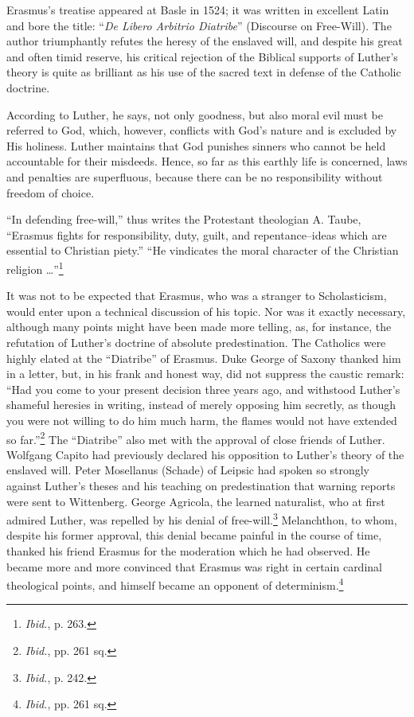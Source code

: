 Erasmus’s treatise appeared at Basle in 1524; it was written in
excellent Latin and bore the title: “\textit{De Libero Arbitrio Diatribe}”
(Discourse on Free-Will). The author triumphantly refutes the
heresy of the enslaved will, and despite his great and often timid
reserve, his critical rejection of the Biblical supports of Luther’s
theory is quite as brilliant as his use of the sacred text in defense
of the Catholic doctrine.

According to Luther, he says, not only goodness, but also moral evil must
be referred to God, which, however, conflicts with God’s nature and is excluded
by His holiness. Luther maintains that God punishes sinners who
cannot be held accountable for their misdeeds. Hence, so far as this earthly
life is concerned, laws and penalties are superfluous, because there can be
no responsibility without freedom of choice.

“In defending free-will,” thus writes the Protestant theologian A. Taube,
“Erasmus fights for responsibility, duty, guilt, and repentance--ideas which
are essential to Christian piety.” “He vindicates the moral character of the
Christian religion \dots''\footnote{\textit{Ibid.}, p. 263.}

It was not to be expected that Erasmus, who was a stranger to
Scholasticism, would enter upon a technical discussion of his topic.
Nor was it exactly necessary, although many points might have been
made more telling, as, for instance, the refutation of Luther’s doctrine
of absolute predestination. The Catholics were highly elated at the
“Diatribe” of Erasmus. Duke George of Saxony thanked him in
a letter, but, in his frank and honest way, did not suppress the caustic
remark: “Had you come to your present decision three years ago,
and withstood Luther’s shameful heresies in writing, instead of merely
opposing him secretly, as though you were not willing to do him
much harm, the flames would not have extended so far.”\footnote
{\textit{Ibid.}, pp. 261 sq.}
The
“Diatribe” also met with the approval of close friends of Luther.
Wolfgang Capito had previously declared his opposition to Luther’s
theory of the enslaved will. Peter Mosellanus (Schade) of Leipsic
had spoken so strongly against Luther’s theses and his teaching on
predestination that warning reports were sent to Wittenberg. George
Agricola, the learned naturalist, who at first admired Luther, was
repelled by his denial of free-will.\footnote{\textit{Ibid.}, p. 242.}
Melanchthon, to whom, despite
his former approval, this denial became painful in the course of time,
thanked his friend Erasmus for the moderation which he had observed.
He became more and more convinced that Erasmus was right in
certain cardinal theological points, and himself became an opponent
of determinism.\footnote{\textit{Ibid.}, pp. 261 sq.}
